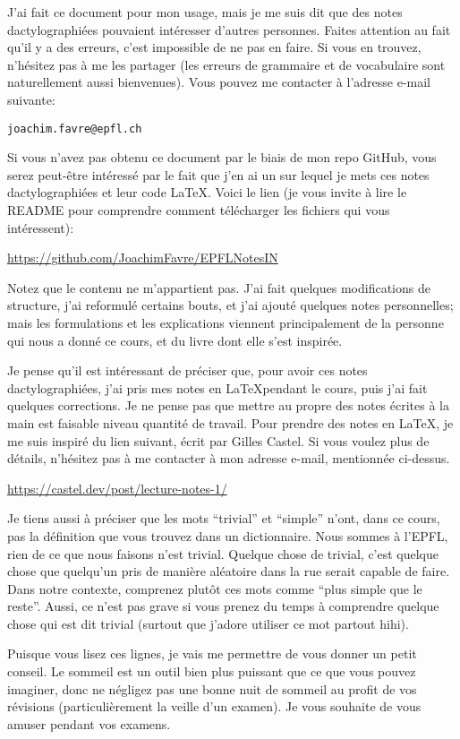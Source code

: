 J'ai fait ce document pour mon usage, mais je me suis dit que des notes dactylographiées pouvaient intéresser d'autres personnes. Faites attention au fait qu'il y a des erreurs, c'est impossible de ne pas en faire. Si vous en trouvez, n'hésitez pas à me les partager (les erreurs de grammaire et de vocabulaire sont naturellement aussi bienvenues). Vous pouvez me contacter à l'adresse e-mail suivante:
\begin{center}
    \texttt{joachim.favre@epfl.ch}
\end{center}

Si vous n'avez pas obtenu ce document par le biais de mon repo GitHub, vous serez peut-être intéressé par le fait que j'en ai un sur lequel je mets ces notes dactylographiées et leur code LaTeX. Voici le lien (je vous invite à lire le README pour comprendre comment télécharger les fichiers qui vous intéressent):
\begin{center}
    \url{https://github.com/JoachimFavre/EPFLNotesIN}
\end{center}

Notez que le contenu ne m'appartient pas. J'ai fait quelques modifications de structure, j'ai reformulé certains bouts, et j'ai ajouté quelques notes personnelles; mais les formulations et les explications viennent principalement de la personne qui nous a donné ce cours, et du livre dont elle s'est inspirée.

Je pense qu'il est intéressant de préciser que, pour avoir ces notes dactylographiées, j'ai pris mes notes en \LaTeX pendant le cours, puis j'ai fait quelques corrections. Je ne pense pas que mettre au propre des notes écrites à la main est faisable niveau quantité de travail. Pour prendre des notes en \LaTeX, je me suis inspiré du lien suivant, écrit par Gilles Castel. Si vous voulez plus de détails, n'hésitez pas à me contacter à mon adresse e-mail, mentionnée ci-dessus.
\begin{center}
    \url{https://castel.dev/post/lecture-notes-1/}
\end{center}

Je tiens aussi à préciser que les mots ``trivial'' et ``simple'' n'ont, dans ce cours, pas la définition que vous trouvez dans un dictionnaire. Nous sommes à l'EPFL, rien de ce que nous faisons n'est trivial. Quelque chose de trivial, c'est quelque chose que quelqu'un pris de manière aléatoire dans la rue serait capable de faire. Dans notre contexte, comprenez plutôt ces mots comme ``plus simple que le reste''. Aussi, ce n'est pas grave si vous prenez du temps à comprendre quelque chose qui est dit trivial (surtout que j'adore utiliser ce mot partout hihi).

Puisque vous lisez ces lignes, je vais me permettre de vous donner un petit conseil. Le sommeil est un outil bien plus puissant que ce que vous pouvez imaginer, donc ne négligez pas une bonne nuit de sommeil au profit de vos révisions (particulièrement la veille d'un examen). Je vous souhaite de vous amuser pendant vos examens.
